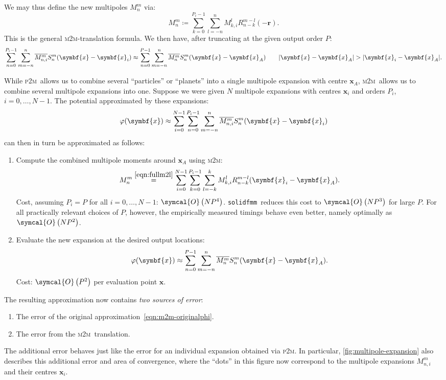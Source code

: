 \documentclass{scrbook}
\newcommand{\solidfmm}{\texttt{solidfmm}}
\newcommand{\PtoM}{\textsc{p2m}}
\newcommand{\MtoM}{\textsc{m2m}}
\newcommand{\vv}[1]{\ensuremath{\symbf{#1}}} %
\newcommand{\bigO}[1]{\ensuremath{\symcal{O}\left({#1}\right)}}
\begin{document}
We may thus define the new multipoles $M_n^m$ via:
\begin{equation}\label{eqn:fullm2l}
M_n^m \coloneqq \sum_{k=0}^{P_i-1} \sum_{l=-n}^{n}
M_{k,i}^lR_{n-k}^{m-l}(-\vv{r}).
\end{equation}
This is the general \MtoM-translation formula. We then have, after truncating
at the given output order $P$:
\begin{equation}
\sum_{n=0}^{P_i-1}\sum_{m=-n\vphantom{0}}^{n}
\overline{M_{n,i}^m}S_n^m(\vv{x}-\vv{x}_i) 
\approx
\sum_{n=0}^{P-1}\sum_{m=-n\vphantom{0}}^{n}
\overline{M_n^m}S_n^m(\vv{x}-\vv{x}_A)
\qquad |\vv{x}-\vv{x}_A| > |\vv{x}_i-\vv{x}_A|.
\end{equation}

While \PtoM\ allows us to combine several \enquote{particles} or
\enquote{planets} into a single multipole expansion with centre $\vv{x}_A$,
\MtoM\ allows us to combine several multipole expansions into one. Suppose we
were given $N$ multipole expansions with centres $\vv{x}_i$ and orders $P_i$,
$i=0,\dotsc,N-1$. The potential approximated by these expansions:
\begin{equation}\label{eqn:m2m-originalphi}
\varphi(\vv{x})\approx
\sum_{i=0}^{N-1}\sum_{n=0}^{P_i-1}\sum_{\vphantom{0}m=-n}^{n}
\overline{M_{n,i}^m}S_n^m(\vv{x}-\vv{x}_i)
\end{equation}
can then in turn be approximated as follows:
\begin{enumerate}
\item Compute the combined multipole moments around $\vv{x}_A$ using
\MtoM:
\begin{equation}
M_n^m 
\stackrel{\eqref{eqn:fullm2l}}{=}
\sum_{i=0}^{N-1}\sum_{k=0}^{P_i-1}\sum_{l=-k}^{k}
M_{k,i}^lR_{n-k}^{m-l}(\vv{x}_i-\vv{x}_A).
\end{equation}
Cost, assuming $P_i=P$ for all $i=0,\dotsc,N-1$: \bigO{NP^4}. \solidfmm\ reduces
this cost to \bigO{NP^3} for large $P$. For all practically relevant choices
of $P$, however, the empirically measured timings behave even better, namely
optimally as~\bigO{NP^2}.
\item Evaluate the new expansion at the desired output locations:
\begin{equation}
\varphi(\vv{x}) \approx \sum_{n=0}^{P-1}\sum_{m=-n\vphantom{0}}^n
\overline{M_n^m}S_n^m(\vv{x}-\vv{x}_A).
\end{equation}
Cost: \bigO{P^2} per evaluation point $\vv{x}$.
\end{enumerate}

The resulting approximation now contains \emph{two sources of error}:
\begin{enumerate}
\item The error of the original approximation~\eqref{eqn:m2m-originalphi}.
\item The error from the \MtoM\ translation.
\end{enumerate}
The additional error behaves just like the error for an individual expansion 
obtained via \PtoM. In particular, \cref{fig:multipole-expansion} also
describes this additional error and area of convergence, where the
\enquote{dots} in this figure now correspond to the multipole expansions
$M_{n,i}^m$ and their centres $\vv{x}_i$.
\end{document}
